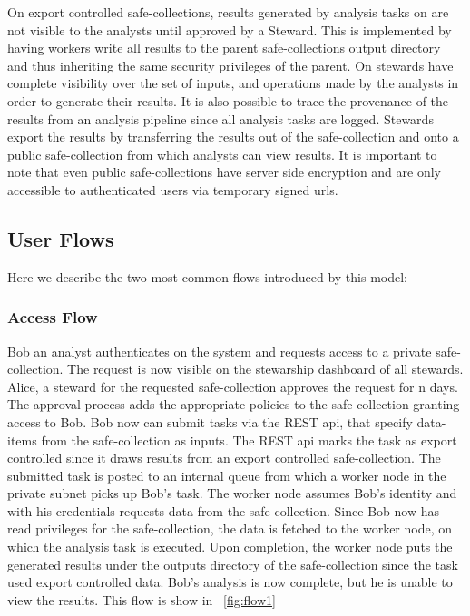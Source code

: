 On export controlled safe-collections, results generated by analysis tasks on \NAME are not visible to the
analysts until approved by a Steward. This is implemented by having workers write all results to the
parent safe-collections output directory and thus inheriting the same security privileges of the parent.
On \NAME stewards have complete visibility over the set of inputs, and operations made by the analysts
in order to generate their results. It is also possible to trace the provenance of the results from an
analysis pipeline since all analysis tasks are logged.
Stewards export the results by transferring the results out of the safe-collection and onto a public
safe-collection from which analysts can view results. It is important to note that even public
safe-collections have server side encryption and are only accessible to authenticated users via temporary
signed urls.


\subsection{User Flows}

Here we describe the two most common flows introduced by this model:

\subsubsection{Access Flow}

Bob an analyst authenticates on the system and requests access to a private safe-collection.
The request is now visible on the stewarship dashboard of all stewards. Alice, a steward for the requested
safe-collection approves the request for n days. The approval process adds the appropriate policies to the
safe-collection granting access to Bob. Bob now can submit tasks via the  REST api, that specify data-items
from the safe-collection as inputs. The REST api marks the task as export controlled since it draws results
from an export controlled safe-collection. The submitted task is posted to an internal queue from which a
worker node in the \NAME private subnet picks up Bob's task. The worker node assumes Bob's identity and with
his credentials requests data from the safe-collection. Since Bob now has read privileges for the
safe-collection, the data is fetched to the worker node, on which the analysis task is executed.
Upon completion, the worker node puts the generated results under the outputs directory of the safe-collection
since the task used export controlled data. Bob's analysis is now complete, but he is unable to view the
results. This flow is show in \figurename~\ref{fig:flow1}

